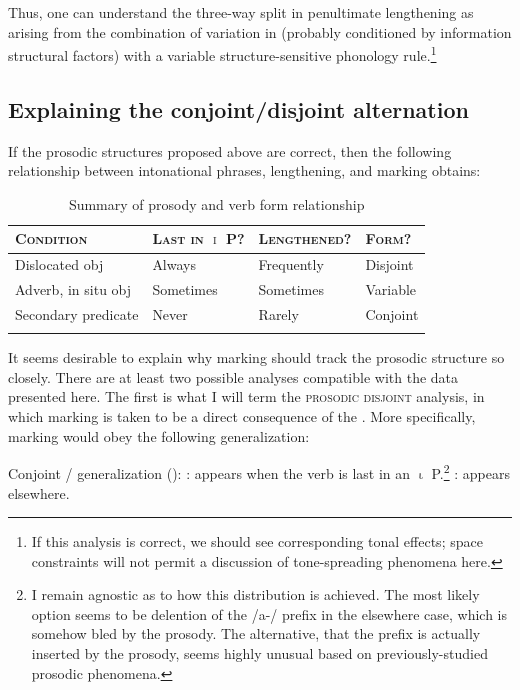 \documentclass[output=paper,modfonts,nonflat,hidelinks]{langsci/langscibook}
\begin{document}
Thus, one can understand the three-way split in penultimate lengthening as
arising from the combination of variation in  (probably
conditioned by information structural factors) with a variable
structure-sensitive phonology rule.\footnote{If this analysis is correct, we
should see corresponding tonal effects; space constraints will not permit a
discussion of  tone-spreading phenomena here.}

\subsection{Explaining the conjoint\slash disjoint alternation}

If the prosodic structures proposed above are correct, then the following
relationship between intonational phrases, lengthening, and  marking
obtains:

\begin{table}
	\caption{Summary of prosody and verb form relationship}
	\label{tab:kusmer:summary_ip_disj}
\begin{tabular}{llll}
\lsptoprule
\textsc{Condition} & \textsc{Last in $\upiota$ P?} & \textsc{Lengthened?} &
	\textsc{Form?}\\
	\midrule
{Dislocated obj}       & Always    & Frequently & Disjoint\\
{Adverb, in situ obj} & Sometimes & Sometimes  & Variable\\
{Secondary predicate}     & Never     & Rarely     & Conjoint\\
\lspbottomrule
\end{tabular}
\end{table}

It seems desirable to explain why  marking should track the prosodic
structure so closely. There are at least two possible analyses compatible with
the data presented here. The first is what I will term the \textsc{prosodic
disjoint} analysis, in which  marking is taken to be a direct
consequence of the . More specifically,  
marking would obey the following generalization:


\ea \label{ex:kusmer:venda_gen_fin} {Conjoint /  generalization ():}
	: appears when the verb is last in an $\upiota$
	P.\footnote{I remain agnostic as to how this distribution is achieved. The
	most likely option seems to be delention of the /a-/ prefix in the
	elsewhere case, which is somehow bled by the prosody. The alternative, that
	the prefix is actually inserted by the prosody, seems highly unusual based
	on previously-studied prosodic phenomena.}
	: appears elsewhere.
	\z
\z
\end{document}
